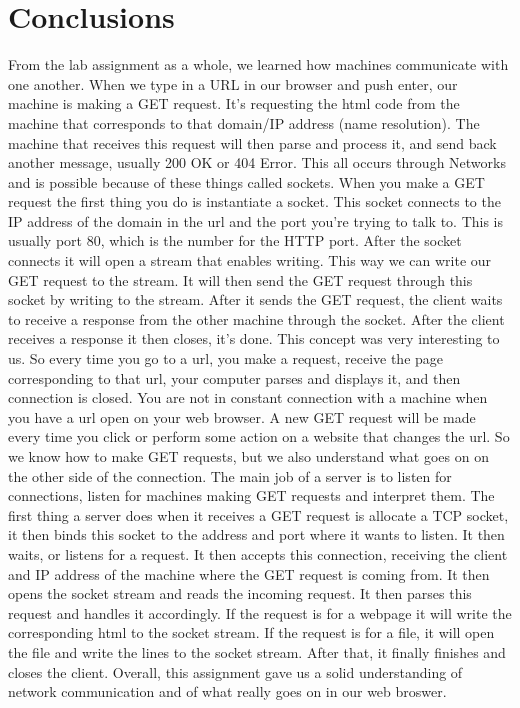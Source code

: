 \documentclass{article}
\begin{document}
    \section*{Conclusions}
    From the lab assignment as a whole, we learned how machines communicate with one another. When we type in a URL in our browser and push enter, our machine is making a GET request. It's requesting the html code from the machine that corresponds to that domain/IP address (name resolution). The machine that receives this request will then parse and process it, and send back another message, usually 200 OK or 404 Error. This all occurs through Networks and is possible because of these things called sockets. When you make a GET request the first thing you do is instantiate a socket. This socket connects to the IP address of the domain in the url and the port you're trying to talk to. This is usually port 80, which is the number for the HTTP port. After the socket connects it will open a stream that enables writing. This way we can write our GET request to the stream. It will then send the GET request through this socket by writing to the stream. After it sends the GET request, the client waits to receive a response from the other machine through the socket. After the client receives a response it then closes, it's done. This concept was very interesting to us. So every time you go to a url, you make a request, receive the page corresponding to that url, your computer parses and displays it, and then connection is closed. You are not in constant connection with a machine when you have a url open on your web browser. A new GET request will be made every time you click or perform some action on a website that changes the url. 
    \newline
    \newline
    So we know how to make GET requests, but we also understand what goes on on the other side of the connection. The main job of a server is to listen for connections, listen for machines making GET requests and interpret them. The first thing a server does when it receives a GET request is allocate a TCP socket, it then binds this socket to the address and port where it wants to listen. It then waits, or listens for a request. It then accepts this connection, receiving the client and IP address of the machine where the GET request is coming from. It then opens the socket stream and reads the incoming request. It then parses this request and handles it accordingly. If the request is for a webpage it will write the corresponding html to the socket stream. If the request is for a file, it will open the file and write the lines to the socket stream. After that, it finally finishes and closes the client. Overall, this assignment gave us a solid understanding of network communication and of what really goes on in our web broswer.
    
    
\end{document}
